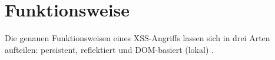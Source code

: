 \section{Funktionsweise}
Die genauen Funktionsweisen eines XSS-Angriffs lassen sich in drei Arten
aufteilen: persistent, reflektiert und DOM-basiert (lokal) \cite{fSidI13}.



